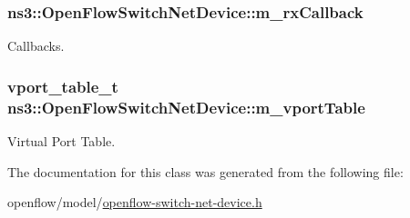 \subsubsection[{\texorpdfstring{m\+\_\+rx\+Callback}{m_rxCallback}}]{ ns3\+::\+Open\+Flow\+Switch\+Net\+Device\+::m\+\_\+rx\+Callback\hspace{0.3cm}{\ttfamily [private]}}\hypertarget{classns3_1_1OpenFlowSwitchNetDevice_ac6ed70a909dccd5edd66088d4560b89a}{}\label{classns3_1_1OpenFlowSwitchNetDevice_ac6ed70a909dccd5edd66088d4560b89a}


Callbacks. 

\subsubsection[{\texorpdfstring{m\+\_\+vport\+Table}{m_vportTable}}]{\setlength{\rightskip}{0pt plus 5cm}vport\+\_\+table\+\_\+t ns3\+::\+Open\+Flow\+Switch\+Net\+Device\+::m\+\_\+vport\+Table\hspace{0.3cm}{\ttfamily [private]}}\hypertarget{classns3_1_1OpenFlowSwitchNetDevice_a454c503adcde4d4636a36bbd2ee37855}{}\label{classns3_1_1OpenFlowSwitchNetDevice_a454c503adcde4d4636a36bbd2ee37855}


Virtual Port Table. 



The documentation for this class was generated from the following file\+:\begin{DoxyCompactItemize}
\item 
openflow/model/\hyperlink{openflow-switch-net-device_8h}{openflow-\/switch-\/net-\/device.\+h}\end{DoxyCompactItemize}
